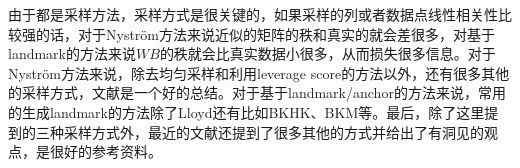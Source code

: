 由于都是采样方法，采样方式是很关键的，如果采样的列或者数据点线性相关性比较强的话，对于Nyström方法来说近似的矩阵的秩和真实的就会差很多，对基于landmark的方法来说$WB$的秩就会比真实数据小很多，从而损失很多信息。对于Nyström方法来说，除去均匀采样和利用leverage score的方法以外，还有很多其他的采样方式，文献\cite{kumar2012sampling}是一个好的总结。对于基于landmark/anchor的方法来说，常用的生成landmark的方法除了Lloyd还有比如BKHK、BKM等。最后，除了这里提到的三种采样方式外，最近的文献\cite{tremblay2020approximating}还提到了很多其他的方式并给出了有洞见的观点，是很好的参考资料。

